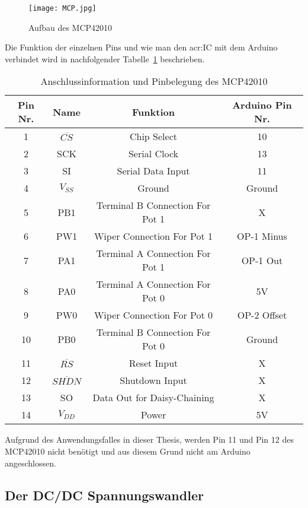 \begin{figure}[H]
	\centering
	\texttt{[image: MCP.jpg]}
	\caption[Aufbau des MCP42010]{Aufbau des MCP42010} 
	\cite{MCP42}
	\label{fig:MCP}
\end{figure}

Die Funktion der einzelnen Pins und wie man den \gls{acr:IC} mit dem Arduino verbindet wird in nachfolgender Tabelle~\ref{tab:pinmcp} beschrieben. 
\begin{table}[htb]
	\begin{center}
		\begin{tabular}[H]{cccc}	
			\toprule
			\textbf{Pin Nr.} & \textbf{Name}  &\textbf{Funktion} & \textbf{Arduino Pin Nr.} \\
			\midrule
			1 & $\overline{CS}$ & Chip Select &  10 \\
			2 & SCK & Serial Clock &  13 \\
			3 & SI & Serial Data Input&  11 \\
			4 & $V_{SS}$ & Ground &  Ground \\
			5 & PB1 & Terminal B Connection For Pot 1 & X \\
			6 & PW1 & Wiper Connection For Pot 1 &  OP-1 Minus \\
			7 & PA1& Terminal A Connection For Pot 1 &  OP-1 Out  \\
			8 & PA0& Terminal A Connection For Pot 0 &  5V \\
			9 & PW0& Wiper Connection For Pot 0 & OP-2 Offset \\
			10 & PB0 & Terminal B Connection For Pot 0 &  Ground \\
			11 & $\overline{RS}$ & Reset Input & X  \\
			12 & $\overline{SHDN}$ & Shutdown Input &X\\
			13 & SO & Data Out for Daisy-Chaining & X \\
			14 & $V_{DD}$ & Power & 5V \\
			\bottomrule
		\end{tabular}
		\caption{Anschlussinformation und Pinbelegung des MCP42010}
		\label{tab:pinmcp}
	\end{center}
\end{table}
Aufgrund des Anwendungsfalles in dieser Thesis, werden Pin 11 und Pin 12 des MCP42010 nicht benötigt und aus diesem Grund nicht am Arduino angeschlossen. 

\subsection{Der DC/DC Spannungswandler}
\label{subsec:Unterabschnitt12}

